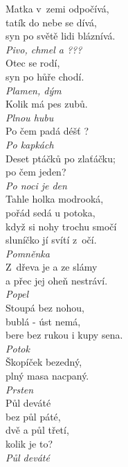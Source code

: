 \begin{multicols}{4}
\noindent
Matka v~zemi odpočívá,\\
tatík do nebe se dívá,\\
syn po světě lidi bláznívá.\\[1 mm]
{\sl Pivo, chmel a ???}\\

\noindent
Otec se rodí,\\
syn po hůře chodí.\\[1 mm]
{\sl Plamen, dým}\\

\noindent
Kolik má pes zubů.\\[1 mm]
{\sl Plnou hubu}\\

\noindent
Po čem padá déšť ?\\[1 mm]
{\sl Po kapkách}\\

\noindent
Deset ptáčků po zlaťáčku;\\
po čem jeden?\\[1 mm]
{\sl Po noci je den}\\

\noindent
Tahle holka modrooká,\\
pořád sedá u potoka,\\
když si nohy trochu smočí\\
sluníčko jí svítí z~očí.\\[1 mm]
{\sl Pomněnka}\\

\noindent
Z~dřeva je a ze slámy\\
a přec jej oheň nestráví.\\[1 mm]
{\sl Popel}\\

\noindent
Stoupá bez nohou,\\
bublá - úst nemá,\\
bere bez rukou i kupy sena.\\[1 mm]
{\sl Potok}\\

\noindent
Škopíček bezedný,\\
plný masa nacpaný.\\[1 mm]
{\sl Prsten}\\

\noindent
Půl deváté\\
bez půl páté,\\
dvě a půl třetí,\\
kolik je to?\\[1 mm]
{\sl Půl deváté}\\


\end{multicols}

